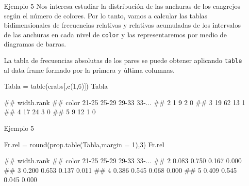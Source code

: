 \documentclass[
  ignorenonframetext,
  aspectratio=169]{beamer}
\newenvironment{Shaded}{\begin{snugshade}}{\end{snugshade}}
\newcommand{\AttributeTok}[1]{\textcolor[rgb]{0.77,0.63,0.00}{#1}}
\newcommand{\DecValTok}[1]{\textcolor[rgb]{0.00,0.00,0.81}{#1}}
\newcommand{\FunctionTok}[1]{\textcolor[rgb]{0.00,0.00,0.00}{#1}}
\newcommand{\NormalTok}[1]{#1}
\newcommand{\OtherTok}[1]{\textcolor[rgb]{0.56,0.35,0.01}{#1}}
\let\oldverbatim\verbatim
\let\endoldverbatim\endverbatim
\renewenvironment{verbatim}{\tiny\oldverbatim}{\endoldverbatim}
\begin{document}
\begin{frame}[fragile]{Ejemplo 5}
\protect\hypertarget{ejemplo-5-4}{}
Nos interesa estudiar la distribución de las anchuras de los cangrejos
según el número de colores. Por lo tanto, vamos a calcular las tablas
bidimensionales de frecuencias relativas y relativas acumuladas de los
intervalos de las anchuras en cada nivel de \texttt{color} y las
representaremos por medio de diagramas de barras.

La tabla de frecuencias absolutas de los pares se puede obtener
aplicando \texttt{table} al data frame formado por la primera y última
columnas.

\begin{Shaded}
\begin{Highlighting}[]
\NormalTok{Tabla }\OtherTok{=} \FunctionTok{table}\NormalTok{(crabs[,}\FunctionTok{c}\NormalTok{(}\DecValTok{1}\NormalTok{,}\DecValTok{6}\NormalTok{)])}
\NormalTok{Tabla}
\end{Highlighting}
\end{Shaded}

\begin{verbatim}
##      width.rank
## color 21-25 25-29 29-33 33-...
##     2     1     9     2      0
##     3    19    62    13      1
##     4    17    24     3      0
##     5     9    12     1      0
\end{verbatim}
\end{frame}

\begin{frame}[fragile]{Ejemplo 5}
\protect\hypertarget{ejemplo-5-5}{}
\begin{Shaded}
\begin{Highlighting}[]
\NormalTok{Fr.rel }\OtherTok{=} \FunctionTok{round}\NormalTok{(}\FunctionTok{prop.table}\NormalTok{(Tabla,}\AttributeTok{margin =} \DecValTok{1}\NormalTok{),}\DecValTok{3}\NormalTok{)}
\NormalTok{Fr.rel}
\end{Highlighting}
\end{Shaded}

\begin{verbatim}
##      width.rank
## color 21-25 25-29 29-33 33-...
##     2 0.083 0.750 0.167  0.000
##     3 0.200 0.653 0.137  0.011
##     4 0.386 0.545 0.068  0.000
##     5 0.409 0.545 0.045  0.000
\end{verbatim}
\end{frame}
\end{document}
